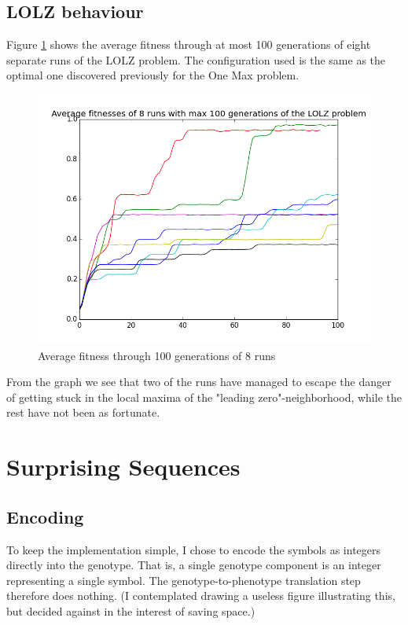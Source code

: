 \documentclass[twoside]{article}
\begin{document}
\begin{multicols}{2}
    \subsection{LOLZ behaviour}

    Figure \ref{fig:lolz-8-runs} shows the average fitness through at most 100 generations of eight separate runs of the LOLZ problem.
    The configuration used is the same as the optimal one discovered previously for the One Max problem.

    \begin{figure}[H]
        \centering
        \includegraphics[width=\linewidth]{images/lolz-8-runs.png}
        \caption{Average fitness through 100 generations of 8 runs} \label{fig:lolz-8-runs}
    \end{figure}

    From the graph we see that two of the runs have managed to escape the danger of getting stuck in the local maxima of the "leading zero"-neighborhood, while the rest have not been as fortunate.


    \section{Surprising Sequences}

    \subsection{Encoding}
    
    To keep the implementation simple, I chose to encode the symbols as integers directly into the genotype.
    That is, a single genotype component is an integer representing a single symbol.
    The genotype-to-phenotype translation step therefore does nothing.
    (I contemplated drawing a useless figure illustrating this, but decided against in the interest of saving space.)


\end{multicols}
\end{document}
